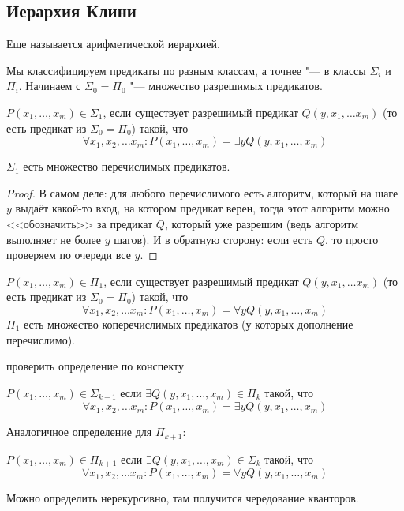 \subsection{Иерархия Клини}
Еще называется арифметической иерархией.

Мы классифицируем предикаты по разным классам, а точнее "--- в классы $\Sigma_i$ и $\Pi_i$.
Начинаем с $\Sigma_0=\Pi_0$ "--- множество разрешимых предикатов.
\begin{Def}
	$P(x_1, \dots, x_m) \in \Sigma_1$, если существует разрешимый предикат $Q(y, x_1, \dots x_m)$
	(то есть предикат из $\Sigma_0 = \Pi_0$) такой, что
	\[
	\forall x_1, x_2, \dots x_m \colon P(x_1, \dots, x_m) = \exists y Q(y, x_1, \dots, x_m)
	\]
\end{Def}
\begin{Rem}
	$\Sigma_1$ есть множество перечислимых предикатов.
\end{Rem}
\begin{proof}
	В самом деле: для любого перечислимого есть алгоритм, который на шаге $y$ выдаёт какой-то
	вход, на котором предикат верен, тогда этот алгоритм можно <<обозначить>> за предикат $Q$,
	который уже разрешим (ведь алгоритм выполняет не более $y$ шагов).
	И в обратную сторону: если есть $Q$, то просто проверяем по очереди все $y$.
\end{proof}

\begin{Def}
  $P(x_1, \dots, x_m) \in \Pi_1$, если существует разрешимый предикат $Q(y, x_1, \dots x_m)$
  (то есть предикат из $\Sigma_0 = \Pi_0$) такой, что
  \[
  \forall x_1, x_2, \dots x_m \colon P(x_1, \dots, x_m) = \forall y Q(y, x_1, \dots, x_m)
  \]
  $\Pi_1$ есть множество коперечислимых предикатов (у которых дополнение перечислимо).
\end{Def}

\TODO проверить определение по конспекту
\begin{Def}
	$P(x_1, \dots, x_m) \in \Sigma_{k+1}$ если $\exists Q(y, x_1, \dots, x_m) \in \Pi_k$ такой,
	что
	\[
	\forall x_1, x_2, \dots x_m \colon P(x_1, \dots, x_m) = \exists y Q(y, x_1, \dots, x_m)
	\]
\end{Def}
Аналогичное определение для $\Pi_{k+1}$:
\begin{Def}
	$P(x_1, \dots, x_m) \in \Pi_{k+1}$ если $\exists Q(y, x_1, \dots, x_m) \in \Sigma_k$ такой,
	что
	\[
	\forall x_1, x_2, \dots x_m \colon P(x_1, \dots, x_m) = \forall y Q(y, x_1, \dots, x_m)
	\]
\end{Def}
Можно определить нерекурсивно, там получится чередование кванторов.

